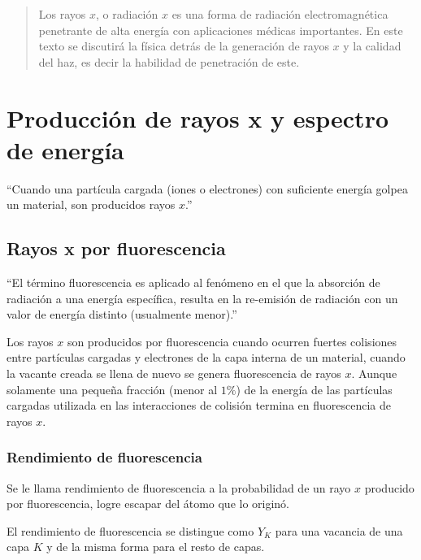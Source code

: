 \begin{abstract}
    Los rayos $x$, o radiación $x$ es una forma de radiación electromagnética penetrante de alta energía con aplicaciones médicas importantes. En este texto se discutirá la física detrás de la generación de rayos $x$ y la calidad del haz, es decir la habilidad de penetración de este.
\end{abstract}


\section{Producción de rayos x y espectro de energía}
``Cuando una partícula cargada (iones o electrones) con suficiente energía golpea un material, son producidos rayos $x$.''
\cite{XrayWiki44:online}

\subsection{Rayos x por fluorescencia}
``El término fluorescencia es aplicado al fenómeno en el que la absorción de radiación a una energía específica, resulta en la re-emisión de radiación con un valor de energía distinto (usualmente menor).''
\cite{Xrayfluo48:online}


Los rayos $x$ son producidos por fluorescencia cuando ocurren fuertes colisiones entre partículas cargadas y electrones de la capa interna de un material, cuando la vacante creada se llena de nuevo se genera fluorescencia de rayos $x$. Aunque solamente una pequeña fracción (menor al $1\%$) de la energía de las partículas cargadas utilizada en las interacciones de colisión termina en fluorescencia de rayos $x$.
\linebreak
\cite{attix2008introduction}

\subsubsection{Rendimiento de fluorescencia}
Se le llama rendimiento de fluorescencia a la probabilidad de un rayo $x$ producido por fluorescencia, logre escapar del átomo que lo originó.

El rendimiento de fluorescencia se distingue como $Y_K$ para una vacancia de una capa $K$ y de la misma forma para el resto de capas.

